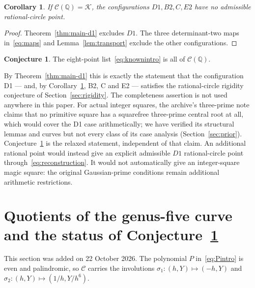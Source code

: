 \documentclass[11pt,letterpaper]{article}
\newtheorem{corollary}[theorem]{Corollary}
\theoremstyle{definition}\newtheorem{definition}[theorem]{Definition}
\newtheorem{conjecture}[theorem]{Conjecture}
\theoremstyle{remark}\newtheorem{remark}[theorem]{Remark}
\newcommand{\Q}{\mathbb Q}\newcommand{\Z}{\mathbb Z}\newcommand{\R}{\mathbb R}
\begin{document}
\begin{corollary}\label{cor:fourtargets}
If $\mathcal C(\Q)=\mathcal K$, the configurations $D1,B2,C,E2$ have no admissible rational-circle point.
\end{corollary}
\begin{proof}
Theorem~\ref{thm:main-d1} excludes $D1$. The three determinant-two maps in~\eqref{eq:maps} and Lemma~\ref{lem:transport} exclude the other configurations.
\end{proof}

\begin{conjecture}\label{conj:points}
The eight-point list~\eqref{eq:knownintro} is all of $\mathcal C(\Q)$.
\end{conjecture}
By Theorem~\ref{thm:main-d1} this is exactly the statement that the configuration D1 — and, by Corollary~\ref{cor:fourtargets}, B2, C and E2 — satisfies the rational-circle rigidity conjecture of Section~\ref{sec:rigidity}. The completeness assertion is not used anywhere in this paper. For actual integer squares, the archive's three-prime note claims that no primitive square has a squarefree three-prime central root at all, which would cover the D1 case arithmetically; we have verified its structural lemmas and curves but not every class of its case analysis (Section~\ref{sec:prior}). Conjecture~\ref{conj:points} is the relaxed statement, independent of that claim. An additional rational point would instead give an explicit admissible $D1$ rational-circle point through~\eqref{eq:reconstruction}. It would not automatically give an integer-square magic square: the original Gaussian-prime conditions remain additional arithmetic restrictions.

\section{Quotients of the genus-five curve and the status of Conjecture~\ref{conj:points}}\label{sec:quotients}
This section was added on 22 October 2026. The polynomial $P$ in~\eqref{eq:Pintro} is even and palindromic, so $\mathcal C$ carries the involutions $\sigma_1:(h,Y)\mapsto(-h,Y)$ and $\sigma_2:(h,Y)\mapsto(1/h,Y/h^6)$.
\end{document}
